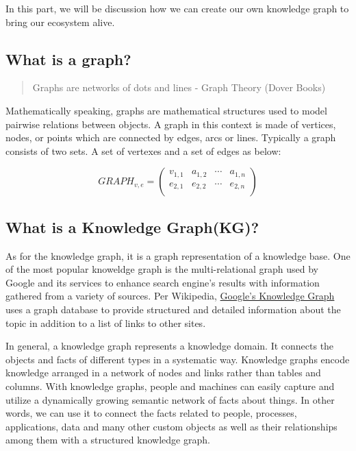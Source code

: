 \documentclass[]{book}
\theoremstyle{definition}
\theoremstyle{definition}
\theoremstyle{definition}
\theoremstyle{remark}
\begin{document}
In this part, we will be discussion how we can create our own knowledge
graph to bring our ecosystem alive.

\subsection{What is a graph?}\label{what-is-a-graph}

\begin{quote}
Graphs are networks of dots and lines - Graph Theory (Dover Books)
\end{quote}

Mathematically speaking, graphs are mathematical structures used to
model pairwise relations between objects. A graph in this context is
made of vertices, nodes, or points which are connected by edges, arcs or
lines. Typically a graph consists of two sets. A set of vertexes and a
set of edges as below:

\[GRAPH_{v,e} =
 \begin{pmatrix}
  v_{1,1} & a_{1,2} & \cdots & a_{1,n} \\
  e_{2,1} & e_{2,2} & \cdots & e_{2,n} \\
 \end{pmatrix}\]

\subsection{What is a Knowledge
Graph(KG)?}\label{what-is-a-knowledge-graphkg}

As for the knowledge graph, it is a graph representation of a knowledge
base. One of the most popular knoweldge graph is the multi-relational
graph used by Google and its services to enhance search engine's results
with information gathered from a variety of sources. Per Wikipedia,
\href{https://developers.google.com/knowledge-graph/\#knowledge_graph_entities}{Google's
Knowledge Graph} uses a graph database to provide structured and
detailed information about the topic in addition to a list of links to
other sites.

In general, a knowledge graph represents a knowledge domain. It connects
the objects and facts of different types in a systematic way. Knowledge
graphs encode knowledge arranged in a network of nodes and links rather
than tables and columns. With knowledge graphs, people and machines can
easily capture and utilize a dynamically growing semantic network of
facts about things. In other words, we can use it to connect the facts
related to people, processes, applications, data and many other custom
objects as well as their relationships among them with a structured
knowledge graph.
\end{document}

